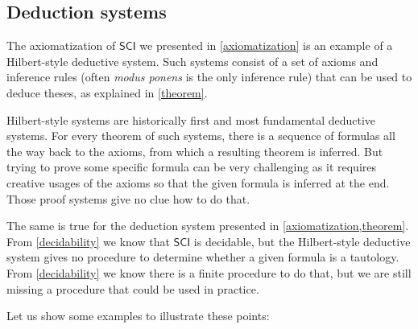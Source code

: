 \documentclass{article}
\theoremstyle{definition}
\theoremstyle{definition}
\theoremstyle{definition}
\theoremstyle{definition}
\theoremstyle{definition}
\newcommand{\SCI}{$\mathsf{SCI}$\xspace}
\begin{document}
\subsection{Deduction systems}

The axiomatization of \SCI we presented in \cref{axiomatization} is an example
of a Hilbert-style deductive system. Such systems consist of a set of axioms
and inference rules (often \emph{modus ponens} is the only inference rule) that
can be used to deduce theses, as explained in \cref{theorem}.

Hilbert-style systems are historically first and most fundamental deductive
systems. For every theorem of such systems, there is a sequence of formulas all
the way back to the axioms, from which a resulting theorem is inferred. But
trying to prove some specific formula can be very challenging as it requires
creative usages of the axioms so that the given formula is inferred at the end.
Those proof systems give no clue how to do that.

The same is true for the deduction system presented in
\cref{axiomatization,theorem}. From \cref{decidability} we know that \SCI is
decidable, but the Hilbert-style deductive system gives no procedure to
determine whether a given formula is a tautology. From \cref{decidability} we
know there is a finite procedure to do that, but we are still missing a
procedure that could be used in practice.

Let us show some examples to illustrate these points:
\end{document}
